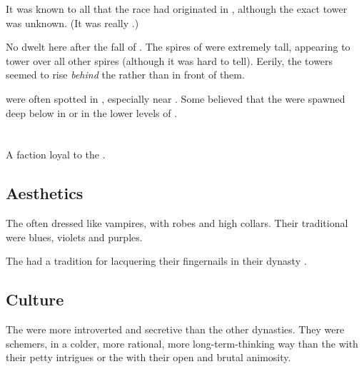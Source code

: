 It was known to all \resphain that the \resphan race had originated in \Tarcharos, although the exact tower was unknown. 
(It was really .)

No \resphain dwelt here after the fall of \Tarcharos. 
The spires of \Carcosa were extremely tall, appearing to tower over all other spires (although it was hard to tell). 
Eerily, the towers seemed to rise \emph{behind} the  rather than in front of them. 

\Umbrae were often spotted in \Oggra, especially near \Carcosa.
Some believed that the \umbrae were spawned deep below in \Oggra or in the lower levels of \Carcosa. 















\section{\TiphredSerah}
A \resphan{} faction loyal to the \banes. 









\subsection{Aesthetics}

The \TiphredSerah{} often dressed like vampires, with robes and high collars. 
Their traditional \colours were blues, violets and purples.

The \TiphredSerah{} had a tradition for lacquering their fingernails in their dynasty \colours. 









\subsection{Culture}
The \TiphredSerah{} were more introverted and secretive than the other dynasties. 
They were schemers, in a colder, more rational, more long-term-thinking way than the \CiriathSepher{} with their petty intrigues or the \Mystraacht{} with their open and brutal animosity. 

